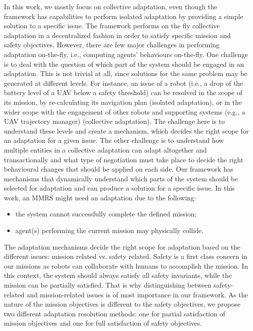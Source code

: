 \documentclass[journal]{IEEEtran}
\theoremstyle{definition}
\begin{document}
In this work, we mostly focus on collective adaptation, even though the framework has capabilities to perform isolated adaptation by providing a simple solution to a specific issue.
The framework performs on the fly collective adaptation in a decentralized fashion in order to satisfy specific mission and safety objectives.
However, there are few major challenges in performing adaptation on-the-fly, i.e., computing agents' behaviours on-the-fly. One challenge is to deal with the question of which part of the system should be engaged in an adaptation. This is not trivial at all, since solutions for the same problem
may be generated at different levels. For instance, an issue of
a robot (i.e., a drop of the battery level of a UAV below a
safety threshold) can be resolved in the scope of its mission,
by re-calculating its navigation plan (isolated adaptation), or in the wider scope
with the engagement of other robots and supporting systems
(e.g., a UAV trajectory manager) (collective adaptation). The challenge here is to
understand these levels and create a mechanism, which decides the right scope for an adaptation for a given issue.
The other challenge is to understand how  multiple
entities in a collective adaptation can adapt altogether and transactionally and what type of negotiation must take place to decide the right behavioural changes that should be applied on each side.
Our framework has mechanisms that dynamically understand  which  parts of the system  should be  selected  for adaptation and can produce a solution for a specific issue. 
 In this work, an MMRS might need 
 an adaptation due to the following:
\begin{itemize}
\item the system cannot successfully complete the defined mission;
\item agent(s) performing the current mission may physically collide. 
\end{itemize}

The adaptation mechanisms decide the right scope  for  %
adaptation based on the different issues: mission related vs. safety related.
  Safety is a first class concern in our missions as robots can collaborate with humans to accomplish the mission. In this context, the system should always satisfy all safety invariants, while the mission can be partially satisfied.
  That is why distinguishing between safety-related and mission-related issues is of most importance in our framework.
 As the nature of the mission objectives is different to the safety objectives, we propose two different adaptation resolution methods: one for partial satisfaction of mission objectives and one for full satisfaction
of safety objectives. 
\end{document}
